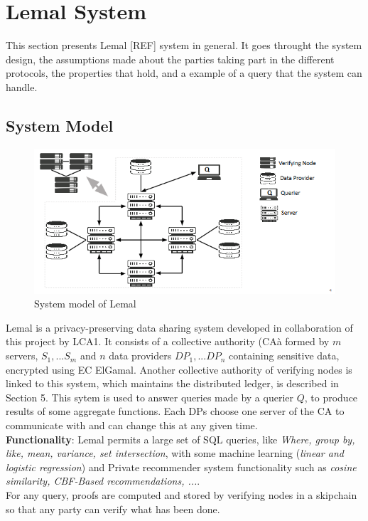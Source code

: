 \documentclass{article}
\begin{document}
\section{Lemal System}
This section presents Lemal [REF] system in general. It goes throught the system design, the assumptions made about the parties taking part in the different protocols, the properties that hold, and a example of a query that the system can handle.\\
\subsection{System Model}
\begin{figure}[H]
\center
\includegraphics[scale=0.75]{img/lemal.png}
\caption{System model of Lemal}
\end{figure}
Lemal is a privacy-preserving data sharing system developed in collaboration of this project by LCA1. It consists of a collective authority (CAà formed by $m$ servers, $S_1,...S_m$ and $n$ data providers $DP_1,...DP_n$ containing sensitive data, encrypted using EC ElGamal.
Another collective authority of verifying nodes is linked to this system, which maintains the distributed ledger, is described in Section 5. This sytem is used to answer queries made by a querier $Q$, to produce results of some aggregate functions. Each DPs choose one server of the CA to communicate with and can change this at any given time.\\
\textbf{Functionality}: Lemal permits a large set of SQL queries, like \textit{Where, group by, like, mean, variance, set intersection}, with some machine learning (\textit{linear and logistic regression}) and Private recommender system functionality such as \textit{cosine similarity, CBF-Based recommendations, ...}.\\
For any query, proofs are computed and stored by verifying nodes in a skipchain so that any party can verify what has been done.
\end{document}

